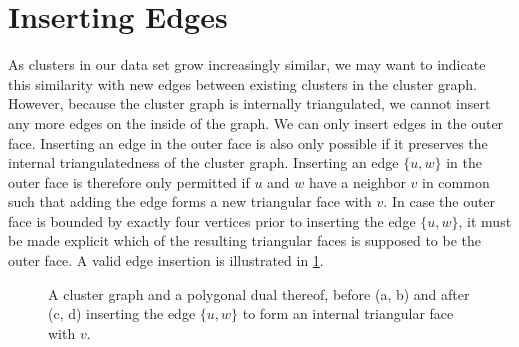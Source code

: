 \section{Inserting Edges}
\label{sect:inserting-edges}

As clusters in our data set grow increasingly similar, we may want to indicate this similarity with new edges between existing clusters in the cluster graph. However, because the cluster graph is internally triangulated, we cannot insert any more edges on the inside of the graph. We can only insert edges in the outer face. Inserting an edge in the outer face is also only possible if it preserves the internal triangulatedness of the cluster graph. Inserting an edge $\{u,w\}$ in the outer face is therefore only permitted if $u$ and $w$ have a neighbor $v$ in common such that adding the edge forms a new triangular face with $v$. In case the outer face is bounded by exactly four vertices prior to inserting the edge $\{u,w\}$, it must be made explicit which of the resulting triangular faces is supposed to be the outer face. A valid edge insertion is illustrated in \cref{fig:insert-edge-outside-example}.

\begin{figure}[H]
	\centering
	\quad
	\qquad
	\quad
	\caption{A cluster graph and a polygonal dual thereof, before (a, b) and after (c, d) inserting the edge $\{u,w\}$ to form an internal triangular face with $v$.}
	\label{fig:insert-edge-outside-example}
\end{figure}

\lipsum
